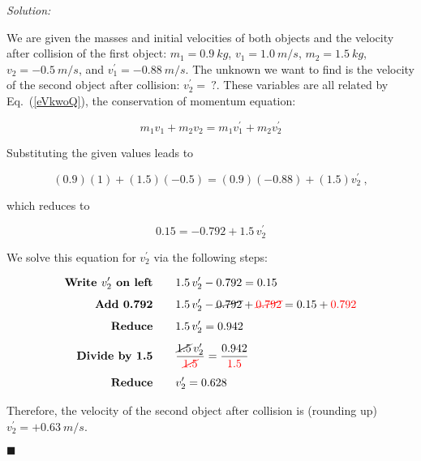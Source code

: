 \documentclass[dvipsnames]{article}
\begin{document}
\textit{Solution:}

We are given the masses and initial velocities of both objects and the velocity after collision of the first object: $m_1 = \SI{0.9}{kg}$, $v_1 = \SI{1.0}{m/s}$, $m_2 = \SI{1.5}{kg}$, $v_2 = \SI{-0.5}{m/s}$, and $v_1^{\prime} = \SI{-0.88}{m/s}$. The unknown we want to find is the velocity of the second object after collision: $v_2^{\prime} =\ ?$. These variables are all related by Eq.~(\ref{eVkwoQ}), the conservation of momentum equation:

\begin{equation*} 
    m_1 v_1 + m_2 v_2 = m_1 v_1^{\prime} + m_2 v_2^{\prime}
\end{equation*}

Substituting the given values leads to

\begin{equation*}
    (0.9)(1) + (1.5)(-0.5) = (0.9)(-0.88) + (1.5) v_2^{\prime}\ ,
\end{equation*}

which reduces to

\begin{equation*}
    0.15 = -0.792 + 1.5\,v_2^{\prime}
\end{equation*}

We solve this equation for $v_2^{\prime}$ via the following steps:
\vspace{-1em}

\begin{align*}
    \textbf{Write $v_2^{\prime}$ on left} \qquad & 1.5\,v_2^{\prime} - 0.792 = 0.15\\[1ex]
    \textbf{Add 0.792} \qquad & 1.5\,v_2^{\prime} - \cancel{0.792} + \textcolor{red}{\cancel{0.792}} = 0.15 + \textcolor{red}{0.792}\\[1ex]
    \textbf{Reduce} \qquad & 1.5\,v_2^{\prime} = 0.942\\[1ex]
    \textbf{Divide by 1.5} \qquad & \frac{\cancel{1.5}\,v_2^{\prime}}{\textcolor{red}{\cancel{1.5}}} = \frac{0.942}{\textcolor{red}{1.5}}\\[1ex]
    \textbf{Reduce} \qquad & v_2^{\prime} = 0.628
\end{align*}

Therefore, the velocity of the second object after collision is (rounding up) $v_2^{\prime} = +\SI{0.63}{m/s}$.

\hfill $\blacksquare$
\end{document}
